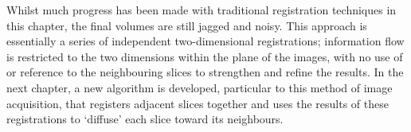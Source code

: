 	Whilst much progress has been made with traditional registration techniques in this chapter, the final volumes are still jagged and noisy. This approach is essentially a series of independent two-dimensional registrations; information flow is restricted to the two dimensions within the plane of the images, with no use of or reference to the neighbouring slices to strengthen and refine the results. In the next chapter, a new algorithm is developed, particular to this method of image acquisition, that registers adjacent slices together and uses the results of these registrations to `diffuse' each slice toward its neighbours.



